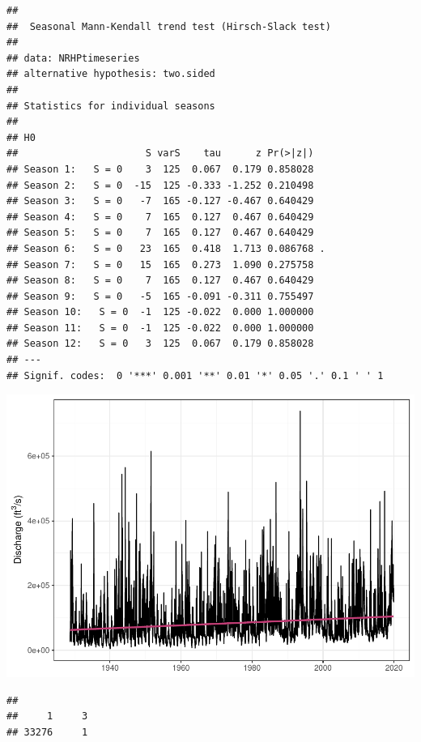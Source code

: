 \documentclass[12pt,]{article}
\begin{document}
\begin{verbatim}
## 
##  Seasonal Mann-Kendall trend test (Hirsch-Slack test)
## 
## data: NRHPtimeseries
## alternative hypothesis: two.sided
## 
## Statistics for individual seasons
## 
## H0
##                      S varS    tau      z Pr(>|z|)  
## Season 1:   S = 0    3  125  0.067  0.179 0.858028  
## Season 2:   S = 0  -15  125 -0.333 -1.252 0.210498  
## Season 3:   S = 0   -7  165 -0.127 -0.467 0.640429  
## Season 4:   S = 0    7  165  0.127  0.467 0.640429  
## Season 5:   S = 0    7  165  0.127  0.467 0.640429  
## Season 6:   S = 0   23  165  0.418  1.713 0.086768 .
## Season 7:   S = 0   15  165  0.273  1.090 0.275758  
## Season 8:   S = 0    7  165  0.127  0.467 0.640429  
## Season 9:   S = 0   -5  165 -0.091 -0.311 0.755497  
## Season 10:   S = 0  -1  125 -0.022  0.000 1.000000  
## Season 11:   S = 0  -1  125 -0.022  0.000 1.000000  
## Season 12:   S = 0   3  125  0.067  0.179 0.858028  
## ---
## Signif. codes:  0 '***' 0.001 '**' 0.01 '*' 0.05 '.' 0.1 ' ' 1
\end{verbatim}

\includegraphics{Project_Template_files/figure-latex/unnamed-chunk-6-10.pdf}

\begin{verbatim}
## 
##     1     3 
## 33276     1
\end{verbatim}
\end{document}
